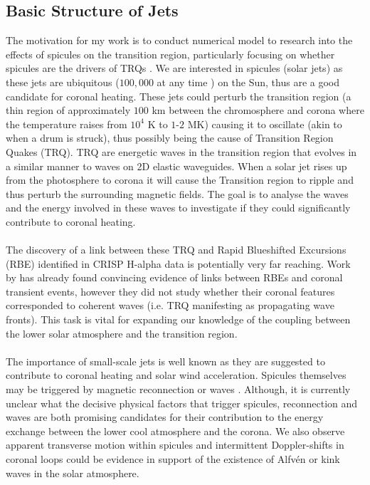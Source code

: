 \documentclass[12pt]{ociamthesis}
\newcommand{\Alfven}{Alfv\'{e}n }
\begin{document}
\subsection{Basic Structure of Jets}
\label{struc_of_jets}
The motivation for my work is to conduct numerical model to research into the effects of spicules on the transition region, particularly focusing on whether spicules are the drivers of TRQs \citep{Scullion2011}. We are interested in spicules (solar jets) as these jets are ubiquitous ($100,000$  at  any  time \citep{Beckers1968}) on the Sun, thus are a good candidate for coronal heating. These jets could perturb the transition region (a thin region of approximately $100$ km between the chromosphere and corona where the temperature raises from $10^4$ K to $1$-$2$ MK) causing it to oscillate (akin to when a drum is struck), thus possibly being the cause of Transition Region Quakes (TRQ). TRQ are energetic waves in the transition region that evolves in a similar manner to waves on 2D elastic waveguides. When a solar jet rises up from the photosphere to corona it will cause the Transition region to ripple and thus perturb the surrounding magnetic fields. The goal is to analyse the waves and the energy involved in these waves to investigate if they could significantly contribute to coronal heating. \\ \\ The discovery of a link between these TRQ and Rapid Blueshifted Excursions (RBE) identified in CRISP H-alpha data is potentially very far reaching. Work by \cite{Henriques2016} has already found convincing evidence of links between RBEs and coronal transient events, however they did not study whether their coronal features corresponded to coherent waves (i.e. TRQ manifesting as propagating wave fronts). This task is vital for expanding our knowledge of the coupling between the lower solar atmosphere and the transition region. \\ \\ The importance of small-scale jets is well known as they are suggested to contribute to coronal heating and solar wind acceleration. Spicules themselves may be triggered by magnetic reconnection \citep{Pontieu2007PASJ} or waves \citep{Pontieu2004Natur}. Although, it is currently unclear what the decisive physical factors that trigger spicules, reconnection and waves are both promising candidates for their contribution to the energy exchange between the lower cool atmosphere and the corona. We also observe apparent transverse motion within spicules and intermittent Doppler-shifts in coronal loops could be evidence in support of the existence of \Alfven or kink waves in the solar atmosphere.  \\ \\
\end{document}
